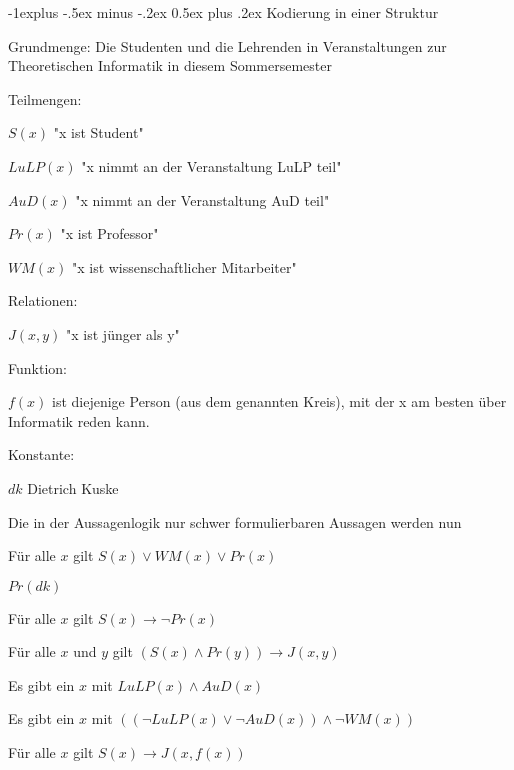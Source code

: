\documentclass[a4paper]{article}
\makeatletter
\renewcommand{\subsection}{\@startsection{subsection}{2}{0mm}%
                {-1explus -.5ex minus -.2ex}%
                {0.5ex plus .2ex}%
                {\normalfont\normalsize\bfseries}}
\makeatother
\begin{document}
\begin{multicols}{3}
  \subsection{Kodierung in einer Struktur}
  \begin{itemize*}
    \item Grundmenge: Die Studenten und die Lehrenden in Veranstaltungen zur Theoretischen Informatik in diesem Sommersemester
    \item Teilmengen:
    \begin{itemize*}
      \item $S(x)$ "x ist Student"
      \item $LuLP(x)$ "x nimmt an der Veranstaltung LuLP teil"
      \item $AuD(x)$ "x nimmt an der Veranstaltung AuD teil"
      \item $Pr(x)$ "x ist Professor"
      \item $WM(x)$ "x ist wissenschaftlicher Mitarbeiter"
    \end{itemize*}
    \item Relationen:
    \begin{itemize*}
      \item $J(x,y)$ "x ist jünger als y"
    \end{itemize*}
    \item Funktion:
    \begin{itemize*}
      \item $f(x)$ ist diejenige Person (aus dem genannten Kreis), mit der x am besten über Informatik reden kann.
    \end{itemize*}
    \item Konstante:
    \begin{itemize*}
      \item $dk$ Dietrich Kuske
    \end{itemize*}
  \end{itemize*}

  Die in der Aussagenlogik nur schwer formulierbaren Aussagen werden nun
  \begin{itemize*}
    \item Für alle $x$ gilt $S(x)\vee WM(x)\vee Pr(x)$
    \item $Pr(dk)$
    \item Für alle $x$ gilt $S(x)\rightarrow\lnot Pr(x)$
    \item Für alle $x$ und $y$ gilt $(S(x)\wedge Pr(y))\rightarrow J(x,y)$
    \item Es gibt ein $x$ mit $LuLP(x)\wedge AuD(x)$
    \item Es gibt ein $x$ mit $((\lnot LuLP(x)\vee\lnot AuD(x))\wedge\lnot WM(x))$
    \item Für alle $x$ gilt $S(x)\rightarrow J(x,f(x))$
  \end{itemize*}


\end{multicols}
\end{document}
